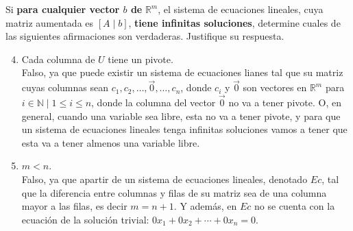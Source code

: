 \documentclass{article}
\begin{document}
\begin{enumerate}
        Si \textbf{para cualquier vector \(b\) de} \(\mathbb{R}^m\),
        el sistema de ecuaciones lineales, cuya matriz aumentada es \(\left[A \mid b\right]\), 
        \textbf{tiene infinitas soluciones},
        determine cuales de las siguientes afirmaciones son verdaderas. Justifique su respuesta.
        \begin{enumerate}[label=\listAlph]
            \setcounter{enumii}{3}
            \item Cada columna de \(U\) tiene un pivote. \\
                Falso, ya que puede existir un sistema de ecuaciones lianes tal que su matriz cuyas columnas sean \(c_1, c_2, \ldots, \vec{0}, \ldots, c_n\),
                donde \(c_i\) y \(\vec{0}\) son vectores en \(\mathbb{R}^m\) para \(i \in \mathbb{N} \mid 1 \leq i \leq n\),
                donde la columna del vector \(\vec{0}\) no va a tener pivote. O, en general, cuando una variable sea libre, esta no va a 
                tener pivote, y para que un sistema de ecuaciones lineales tenga infinitas soluciones vamos a tener que esta va a tener almenos una variable libre.
            \setcounter{enumii}{6}
            \item \(m < n\). \\
                Falso, ya que apartir de un sistema de ecuaciones lineales, denotado \(Ec\), tal que la diferencia entre columnas y filas de su matriz sea de una columna mayor a las filas,
                es decir \(m = n + 1\). Y además, en \(Ec\) no se cuenta con la ecuación de la solución trivial: \(0x_1 + 0x_2 + \cdots + 0x_n = 0\). 

\end{enumerate}
\end{enumerate}
\end{document}
